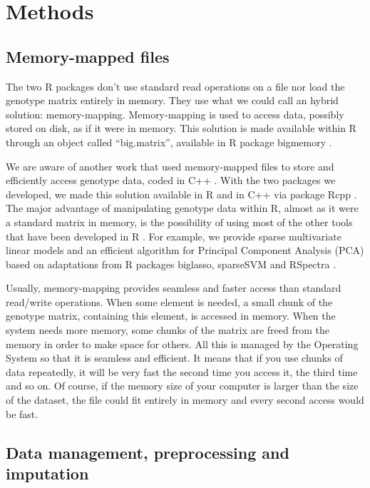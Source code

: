 \documentclass{bioinfo}
\begin{document}
\section{Methods}

\subsection{Memory-mapped files}

The two R packages don't use standard read operations on a file nor load the genotype matrix entirely in memory. They use what we could call an hybrid solution: memory-mapping. Memory-mapping is used to access data, possibly stored on disk, as if it were in memory. This solution is made available within R through an object called ``big.matrix'', available in R package bigmemory \cite[]{Kane2013}.


We are aware of another work that used memory-mapped files to store and efficiently access genotype data, coded in C++ \cite[]{Nielsen2008}. With the two packages we developed, we made this solution available in R and in C++ via package Rcpp \cite[]{Eddelbuettel2011}. The major advantage of manipulating genotype data within R, almost as it were a standard matrix in memory, is the possibility of using most of the other tools that have been developed in R \cite[]{R2017}. For example, we provide sparse multivariate linear models and an efficient algorithm for Principal Component Analysis (PCA) based on adaptations from R packages biglasso, sparseSVM and RSpectra \cite[]{Zeng2017,RSpectra2016}.

Usually, memory-mapping provides seamless and faster access than standard read/write operations. When some element is needed, a small chunk of the genotype matrix, containing this element, is accessed in memory. When the system needs more memory, some chunks of the matrix are freed from the memory in order to make space for others. All this is managed by the Operating System so that it is seamless and efficient. It means that if you use chunks of data repeatedly, it will be very fast the second time you access it, the third time and so on. Of course, if the memory size of your computer is larger than the size of the dataset, the file could fit entirely in memory and every second access would be fast. 


\subsection{Data management, preprocessing and imputation} \label{sec:preprocess}
\end{document}
